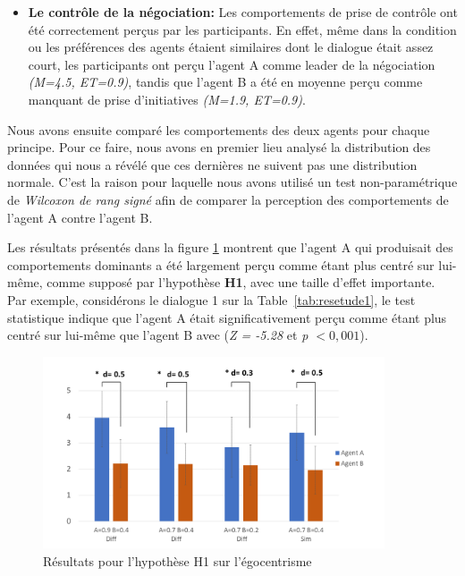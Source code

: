 {\begin{itemize}
					\item  \textbf{Le contrôle de la négociation:} Les comportements de prise de contrôle ont été correctement perçus par les participants. En effet, même dans la condition ou les préférences des agents étaient similaires dont le dialogue était assez court, les participants ont perçu l'agent A comme leader de la négociation \textit{(M=4.5, ET=0.9)}, tandis que l'agent B a été en moyenne perçu comme manquant de prise d'initiatives \textit{(M=1.9, ET=0.9)}.
					
				\end{itemize}
				
				
				
			Nous avons ensuite comparé les comportements des deux agents pour chaque principe. Pour ce faire, nous avons en premier lieu analysé la distribution des données qui nous a révélé que ces dernières ne suivent pas une distribution normale. C'est la raison pour laquelle nous avons utilisé un test non-paramétrique de \emph{Wilcoxon  de rang signé} afin de comparer la perception des comportements de l'agent A contre l'agent B.
			
			Les résultats présentés dans la figure \ref{fig:H1} montrent que l'agent A qui produisait des comportements dominants a été largement perçu comme étant plus centré sur lui-même, comme supposé par l'hypothèse \textbf {H1}, avec une taille d'effet importante. Par exemple, considérons le dialogue 1 sur la Table~\ref {tab:resetude1}, le test statistique indique que l'agent A était significativement perçu comme étant plus centré sur lui-même que l'agent B avec (\emph {Z = -5.28} et  \emph {p $ <0,001 $}).
				\begin{figure}[h]
				\includegraphics[width=0.9\textwidth, height= 0.25 \textheight]{Figures/chap4/AA/graphs/Diapositive1.PNG}
					\caption{Résultats pour l'hypothèse H1 sur l'égocentrisme \label{fig:H1}}
				\end{figure}	
			
}
